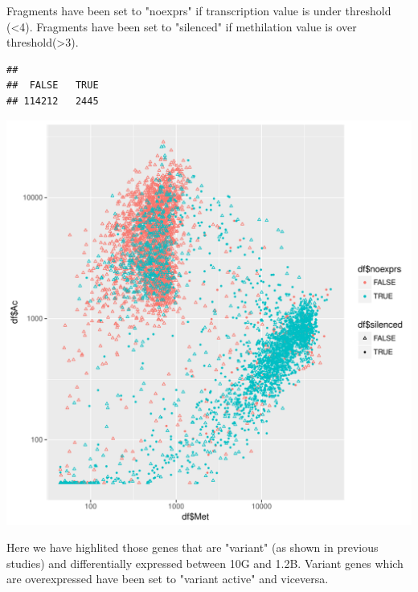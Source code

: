 \documentclass{article}\usepackage[]{graphicx}\usepackage[]{color}
\makeatletter
\newenvironment{kframe}{%
 \def\at@end@of@kframe{}%
 \ifinner\ifhmode%
  \def\at@end@of@kframe{\end{minipage}}%
  \begin{minipage}{\columnwidth}%
 \fi\fi%
 \def\FrameCommand##1{\hskip\@totalleftmargin \hskip-\fboxsep
 \colorbox{shadecolor}{##1}\hskip-\fboxsep
     \hskip-\linewidth \hskip-\@totalleftmargin \hskip\columnwidth}%
 \MakeFramed {\advance\hsize-\width
   \@totalleftmargin\z@ \linewidth\hsize
   \@setminipage}}%
 {\par\unskip\endMakeFramed%
 \at@end@of@kframe}
\newenvironment{knitrout}{}{} %
\makeatother
\begin{document}
Fragments have been set to "noexprs" if transcription value is under threshold (<4).
Fragments have been set to "silenced" if methilation value is over threshold(>3).
\begin{knitrout}
\color{fgcolor}\begin{kframe}
\begin{verbatim}
## 
##  FALSE   TRUE 
## 114212   2445
\end{verbatim}
\end{kframe}
\includegraphics[width=1\linewidth]{figure/ac_met_log-1} 

\end{knitrout}
\clearpage
Here we have highlited those genes that are "variant" (as shown in previous studies) and differentially expressed between 10G and 1.2B. Variant genes which are overexpressed have been set to "variant active" and viceversa.
\end{document}
